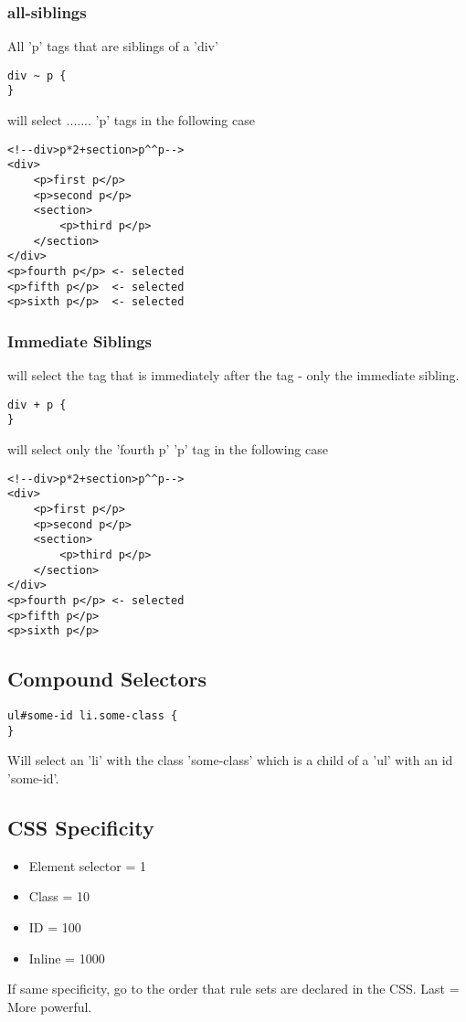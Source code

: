 \documentclass[]{article}
\newcommand{\<}{\guilsinglleft}
\renewcommand{\>}{\guilsinglright}
\begin{document}
\subsubsection{all-siblings}
All 'p' tags that are siblings of a 'div'
\begin{lstlisting}
div ~ p {
}
\end{lstlisting}
will select ....... 'p' tags in the following case
\begin{lstlisting}
<!--div>p*2+section>p^^p-->
<div>
	<p>first p</p> 
	<p>second p</p>  
	<section>
		<p>third p</p> 
	</section>
</div>
<p>fourth p</p> <- selected 
<p>fifth p</p>  <- selected 
<p>sixth p</p>  <- selected 
\end{lstlisting}

\subsubsection{Immediate Siblings}
will select the tag that is immediately after the tag - only the immediate sibling.
\begin{lstlisting}
div + p {
}
\end{lstlisting}
will select only the 'fourth p' 'p' tag in the following case
\begin{lstlisting}
<!--div>p*2+section>p^^p-->
<div>
	<p>first p</p> 
	<p>second p</p>  
	<section>
		<p>third p</p> 
	</section>
</div>
<p>fourth p</p> <- selected 
<p>fifth p</p>  
<p>sixth p</p>  
\end{lstlisting}

\subsection{Compound Selectors}
\begin{lstlisting}
ul#some-id li.some-class {
}
\end{lstlisting}
Will select an 'li' with the class 'some-class' which is a child of a 'ul' with an id 'some-id'.

\subsection{CSS Specificity}
\begin{itemize}
	\item Element selector = 1 
	\item Class = 10
	\item ID = 100
	\item Inline = 1000 
\end{itemize}
If same specificity, go to the order that rule sets are declared in the CSS.  Last = More powerful.
\end{document}

